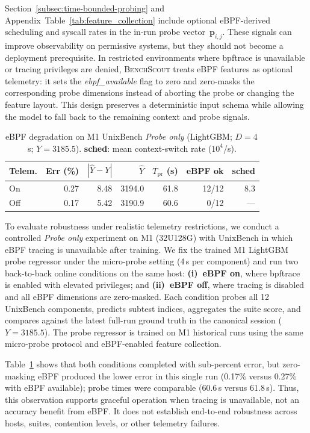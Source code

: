 \documentclass[sigconf, review, anonymous, balance=false]{acmart}
\newcommand{\ourmethod}{\textsc{BenchScout}\xspace}
\newcommand{\id}[1]{{\itshape #1}}
\begin{document}
Section~\ref{subsec:time-bounded-probing} and Appendix~Table~\ref{tab:feature_collection} include optional eBPF-derived scheduling and syscall rates in the in-run probe vector~\(\mathbf{p}_{i,j}\).
These signals can improve observability on permissive systems, but they should not become a deployment prerequisite.
In restricted environments where bpftrace is unavailable or tracing privileges are denied, \ourmethod{} treats eBPF features as optional telemetry: it sets the \id{ebpf\_available} flag to zero and zero-masks the corresponding probe dimensions instead of aborting the probe or changing the feature layout.
This design preserves a deterministic input schema while allowing the model to fall back to the remaining context and probe signals.
\begin{table}[t]
\centering
\caption{eBPF degradation on M1 UnixBench \emph{Probe only} (LightGBM; $D{=}4$\,s; $Y{=}3185.5$). \textbf{sched}: mean context-switch rate ($10^4$/s).}
\label{tab:probe-ebpf-ablation}
\small
\begin{tabular*}{\columnwidth}{@{\extracolsep{\fill}}lrrrrrr@{}}
\toprule
\textbf{Telem.} & \textbf{Err (\%)} & $|\hat{Y}{-}Y|$ & $\hat{Y}$ & $T_{\mathrm{pr}}$ (s) & \textbf{eBPF ok} & \textbf{sched} \\
\midrule
On  & 0.27 & 8.48 & 3194.0 & 61.8 & 12/12 & 8.3 \\
Off & 0.17 & 5.42 & 3190.9 & 60.6 & 0/12 & --- \\
\bottomrule
\end{tabular*}
\end{table}

To evaluate robustness under realistic telemetry restrictions, we conduct a controlled \emph{Probe only} experiment on M1 (32U128G) with UnixBench in which eBPF tracing is unavailable after training. We fix the trained M1 LightGBM probe regressor under the micro-probe setting (4\,s per component) and run two back-to-back online conditions on the same host:
\textbf{(i)~eBPF on}, where bpftrace is enabled with elevated privileges; and
\textbf{(ii)~eBPF off}, where tracing is disabled and all eBPF dimensions are zero-masked.
Each condition probes all 12 UnixBench components, predicts subtest indices, aggregates the suite score, and compares against the latest full-run ground truth in the canonical session (\(Y=3185.5\)).
The probe regressor is trained on M1 historical runs using the same micro-probe protocol and eBPF-enabled feature collection.

Table~\ref{tab:probe-ebpf-ablation} shows that both conditions completed with sub-percent error, but zero-masking eBPF produced the lower error in this single run (0.17\% versus 0.27\% with eBPF available); probe times were comparable (60.6\,s versus 61.8\,s).
Thus, this observation supports graceful operation when tracing is unavailable, not an accuracy benefit from eBPF. It does not establish end-to-end robustness across hosts, suites, contention levels, or other telemetry failures.
\end{document}
